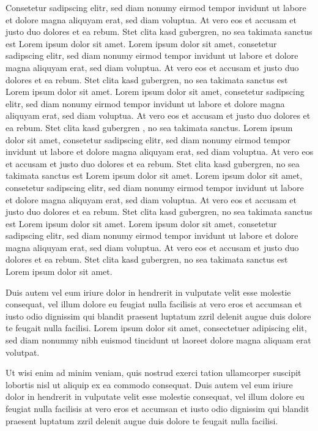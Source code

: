 \documentclass{article}
\begin{document}
Consetetur sadipscing elitr, sed diam nonumy eirmod tempor invidunt ut labore et dolore magna aliquyam erat, sed diam
voluptua. At vero eos et accusam et justo duo dolores et ea rebum. Stet clita kasd gubergren, no sea takimata sanctus
est Lorem ipsum dolor sit amet. Lorem ipsum dolor sit amet, consetetur sadipscing elitr, sed diam nonumy eirmod
tempor invidunt ut labore et dolore magna aliquyam erat, sed diam voluptua. At vero eos et accusam et justo duo
dolores et ea rebum. Stet clita kasd gubergren, no sea takimata sanctus est Lorem ipsum dolor sit amet. Lorem ipsum
dolor sit amet, consetetur sadipscing elitr, sed diam nonumy eirmod tempor invidunt ut labore et dolore magna
aliquyam erat, sed diam voluptua. At vero eos et accusam et justo duo dolores et ea rebum. Stet clita kasd gubergren
, no sea takimata sanctus. Lorem ipsum dolor sit amet, consetetur sadipscing elitr, sed diam nonumy eirmod tempor
invidunt ut labore et dolore magna aliquyam erat, sed diam voluptua. At vero eos et accusam et justo duo dolores et
ea rebum. Stet clita kasd gubergren, no sea takimata sanctus est Lorem ipsum dolor sit amet. Lorem ipsum dolor sit
amet, consetetur sadipscing elitr, sed diam nonumy eirmod tempor invidunt ut labore et dolore magna aliquyam erat,
sed diam voluptua. At vero eos et accusam et justo duo dolores et ea rebum. Stet clita kasd gubergren, no sea
takimata sanctus est Lorem ipsum dolor sit amet. Lorem ipsum dolor sit amet, consetetur sadipscing elitr, sed diam
nonumy eirmod tempor invidunt ut labore et dolore magna aliquyam erat, sed diam voluptua. At vero eos et accusam et
justo duo dolores et ea rebum. Stet clita kasd gubergren, no sea takimata sanctus est Lorem ipsum dolor sit amet.

Duis autem vel eum iriure dolor in hendrerit in vulputate velit esse molestie consequat, vel illum dolore eu feugiat
nulla facilisis at vero eros et accumsan et iusto odio dignissim qui blandit praesent luptatum zzril delenit augue
duis dolore te feugait nulla facilisi. Lorem ipsum dolor sit amet, consectetuer adipiscing elit, sed diam nonummy
nibh euismod tincidunt ut laoreet dolore magna aliquam erat volutpat.

Ut wisi enim ad minim veniam, quis nostrud exerci tation ullamcorper suscipit lobortis nisl ut aliquip ex ea commodo
consequat. Duis autem vel eum iriure dolor in hendrerit in vulputate velit esse molestie consequat, vel illum dolore
eu feugiat nulla facilisis at vero eros et accumsan et iusto odio dignissim qui blandit praesent luptatum zzril
delenit augue duis dolore te feugait nulla facilisi.
\end{document}
